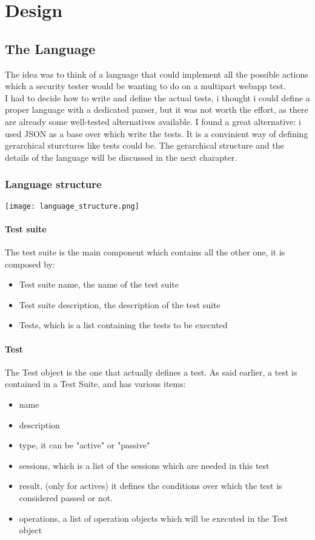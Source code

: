 \chapter{Design}

\section{The Language}
The idea was to think of a language that could implement all the possible actions which a security tester would be wanting to do on a multipart webapp test.\\
I had to decide how to write and define the actual tests, i thought i could define a proper language with a dedicated parser, but it was not worth the effort, as there are already some well-tested alternatives available. I found a great alternative: i used JSON as a base over which write the tests. It is a convinient way of defining gerarchical sturctures like tests could be.
The gerarchical structure and the details of the language will be discussed in the next charapter.

\subsection{Language structure}
\texttt{[image: language\_structure.png]}

\subsubsection{Test suite}
The test suite is the main component which contains all the other one, it is composed by:
\begin{itemize}
    \item Test suite name, the name of the test suite
    \item Test suite description, the description of the test suite
    \item Tests, which is a list containing the tests to be executed
\end{itemize}

\subsubsection{Test}
The Test object is the one that actually defines a test. As said earlier, a test is contained in a Test Suite, and has various items:
\begin{itemize}
    \item name
    \item description
    \item type, it can be "active" or "passive"
    \item sessions, which is a list of the sessions which are needed in this test
    \item result, (only for actives) it defines the conditions over which the test is considered passed or not.
    \item operations, a list of operation objects which will be executed in the Test object
\end{itemize}

